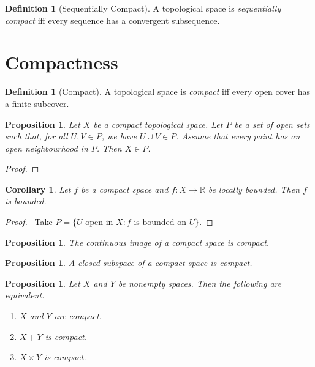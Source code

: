 \documentclass{book}
\let\qed\relax
\newtheorem{prop}[ax]{Proposition}
\newtheorem{cor}{Corollary}[ax]
\theoremstyle{definition}
\newtheorem{df}[ax]{Definition}
\begin{document}
\begin{df}[Sequentially Compact]
A topological space is \emph{sequentially compact} iff every sequence has a convergent subsequence.
\end{df}

\section{Compactness}

\begin{df}[Compact]
A topological space is \emph{compact} iff every open cover has a finite subcover.
\end{df}

\begin{prop}
Let $X$ be a compact topological space. Let $P$ be a set of open sets such that, for all $U,V \in P$, we have $U \cup V \in P$. Assume that every point has an open neighbourhood in $P$. Then $X \in P$.
\end{prop}

\begin{proof}
\pf
{}
\qed
\end{proof}

\begin{cor}
Let $f$ be a compact space and $f : X \rightarrow \mathbb{R}$ be locally bounded. Then $f$ is bounded.
\end{cor}

\begin{proof}
\pf\ Take $P = \{ U \text{ open in } X : f \text{ is bounded on } U \}$. \qed
\end{proof}

\begin{prop}
The continuous image of a compact space is compact.
\end{prop}

\begin{prop}
A closed subspace of a compact space is compact.
\end{prop}

\begin{prop}
Let $X$ and $Y$ be nonempty spaces. Then the following are equivalent.
\begin{enumerate}
\item $X$ and $Y$ are compact.
\item $X + Y$ is compact.
\item $X \times Y$ is compact.
\end{enumerate}
\end{prop}
\end{document}
